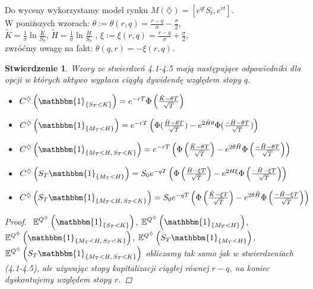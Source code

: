 \documentclass[11pt]{report}
\newtheorem{stw}{Stwierdzenie}[chapter]
\begin{document}
Do wyceny wykorzystamy model rynku $M(\diamondsuit)=[e^{qt}S_t,e^{rt}]$. \\
W poniższych wzorach:
$\theta:=\theta(r,q) = \frac{r-q}{\sigma}-\frac{\sigma}{2}$,\\ $\tilde{K} = \frac{1}{\sigma}\ln\frac{K}{S_0}$,  $\tilde{H} = \frac{1}{\sigma}\ln\frac{H}{S_0}$ , $\xi:=\xi(r,q) = \frac{r-q}{\sigma}+\frac{\sigma}{2} $,\\ zwróćmy uwagę na fakt: $\theta(q,r) = -\xi(r,q). $
\begin{stw} Wzory ze stwierdzeń 4.1-4.5 mają następujące odpowiedniki dla opcji w których aktywo wypłaca ciągłą dywidendę względem stopy $q$.
\vspace{0.5cm}


\begin{itemize} 
\item $C^{\diamondsuit}\left( \mathbbm{1}_{ \{ S_T<K \} } \right) =  e^{-rT}\Phi \left(\frac{ \tilde{K} - \theta T }{\sqrt{T}}\right) $

\item $C^{\diamondsuit}\left( \mathbbm{1}_{ \{ M_T<H \} }\right) = e^{-rT}\left(\Phi(\frac{ \tilde{H}-\theta T }{\sqrt{T}}) - e^{2\tilde{H}\theta}\Phi(\frac{-\tilde{H}-\theta T  }{\sqrt{T}})\right) $

\item $ C^{\diamondsuit}\left(\mathbbm{1}_{ \{ M_T < H, \, S_T < K \} }\right) = e^{-rT}\left(\Phi \left(\frac{ \tilde{K}-\theta T }{\sqrt{T}}\right) - e^{2 \theta \tilde{H}}\Phi\left(\frac{ -\tilde{H}-\theta T }{\sqrt{T}}\right)  \right) $

\item $ C^{\diamondsuit}\left( S_T\mathbbm{1}_{\{ M_T<H \}} \right) = S_0e^{-qT}\left(\Phi \left(\frac{ \tilde{H}-\xi T }{\sqrt{T}}\right) - e^{2H\xi}\Phi \left(\frac{ -\tilde{H}-\xi T }{\sqrt{T}}\right)\right) $ 

\item $ C^{\diamondsuit}\left( S_T\mathbbm{1}_{\{ M_T<H,\, S_T < K \}}\right) = S_0e^{-qT}\left(\Phi\left(\frac{ \tilde{K} - \xi T }{\sqrt{T}}\right) - e^{2 \theta \tilde{H}}\Phi \left(\frac{ -\tilde{H}-\xi T }{\sqrt{T}}\right) \right) $
\end{itemize}

\begin{proof} $ $\newline
$ \mathbb{E}^{Q^{\diamondsuit}} \left( \mathbbm{1}_{ \{ S_T<K \} } \right) $, $\mathbb{E}^{Q^{\diamondsuit}} \left( \mathbbm{1}_{ \{ M_T<H \} } \right) $, $\mathbb{E}^{Q^{\diamondsuit}} \left( \mathbbm{1}_{ \{ M_T<H, \, S_T < K \} } \right) $, $\mathbb{E}^{Q^{\diamondsuit}} \left( S_T \mathbbm{1}_{ \{ M_T<H \} } \right) $, $\mathbb{E}^{Q^{\diamondsuit}} \left( S_T \mathbbm{1}_{ \{ M_T<H, \, S_T < K \} } \right) $ obliczamy tak samo jak w stwierdzeniach \\ (4.1-4.5), ale używając stopy kapitalizacji ciągłej równej $r-q$, na koniec dyskontujemy względem stopy $r$.

\end{proof}


\end{stw}
\end{document}
